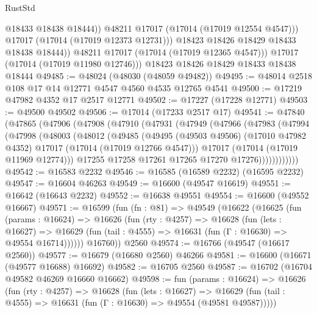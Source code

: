 \begin{lexlean}{RustStd}
\begin{coremodule}
{\begin{coremodule}
{{{{{{{{{{{{{{{{{{{{{{{{{{{{{{{{{{{{{{{{{{{{{{{{{{{{{{{                    @18433
                    @18438
                    @18444))
                @48211
                @17017
                (@17014 (@17019 @12554 @4547)))
              @17017
              (@17014 (@17019 @12373 @12731)))
            @18423
            @18426
            @18429
            @18433
            @18438
            @18444))
        @48211
        @17017
        (@17014 (@17019 @12365 @4547)))
      @17017
      (@17014 (@17019 @11980 @12746)))
    @18423
    @18426
    @18429
    @18433
    @18438
    @18444
@49485 := @48024 (@48030 (@48059 @49482))
@49495 := @48014 @2518 @108 @17 @14 @12771 @4547 @4560 @4535 @12765 @4541
@49500 := @17219 @47982 @4352 @17 @2517 @12771
@49502 := @17227 (@17228 @12771)
@49503 := @49500 @49502
@49506 := @17014 (@17233 @2517 @17)
@49541 := @47840
    (@47865
      (@47906
        (@47908
          (@47910
            (@47931
              (@47949
                (@47966
                  (@47983
                    (@47994
                      (@47998
                        (@48003
                          (@48012
                            (@49485
                              (@49495
                                (@49503 @49506)
                                (@17010 @47982 @4352)
                                @17017
                                (@17014 (@17019 @12766 @4547)))
                              @17017
                              (@17014 (@17019 @11969 @12774)))
                            @17255
                            @17258
                            @17261
                            @17265
                            @17270
                            @17276))))))))))))
@49542 := @16583 @2232
@49546 := @16585 (@16589 @2232) (@16595 @2232)
@49547 := @16604 @46263
@49549 := @16600 (@49547 @16619)
@49551 := @16642 (@16643 @2232)
@49552 := @16638 @49551
@49554 := @16600 (@49552 @16667)
@49571 := @16599
    (fun (fn : @81) =>
    @49549
      (@16622
        (@16625
          (fun (params : @16624) =>
          @16626
            (fun (rty : @4257) =>
            @16628
              (fun (lets : @16627) =>
              @16629 (fun (tail : @4555) => @16631 (fun (Γ : @16630) => @49554 @16714))))))
        @16760))
    @2560
@49574 := @16766 (@49547 (@16617 @2560))
@49577 := @16679 (@16680 @2560) @46266
@49581 := @16600 (@16671 (@49577 @16688) @16692)
@49582 := @16705 @2560
@49587 := @16702 (@16704 @49582 @46269 @16660 @16662)
@49598 := fun (params : @16624) =>
  @16626
    (fun (rty : @4257) =>
    @16628
      (fun (lets : @16627) =>
      @16629 (fun (tail : @4555) => @16631 (fun (Γ : @16630) => @49554 (@49581 @49587)))))
}}}}}}}}}}}}}}}}}}}}}}}}}}}}}}}}}}}}}}}}}}}}}}}}}}}}}}}
\end{coremodule}}
\end{coremodule}
\end{lexlean}
